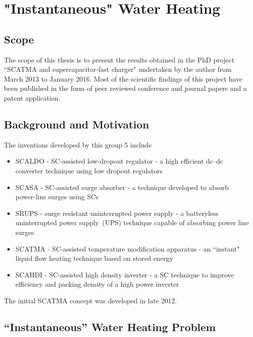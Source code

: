 \chapter{\textbf{"Instantaneous" Water Heating}}

\section{Scope}

The scope of this thesis is to present the results obtained in the PhD project ``SCATMA and supercapacitor-fast charger" undertaken by the author from March 2013 to January 2016. Most of the scientific findings of this project have been published in the form of peer reviewed conference and journal papers and a patent application. 

\section{Background and Motivation}

The inventions  developed by this group 
5
 include

\begin{itemize}
	
	\item SCALDO - SC-assisted low-dropout regulator - a high efficient dc--dc converter technique using low dropout regulators\cite{SCALDO_patent}
	\item SCASA - SC-assisted surge absorber - a technique developed to absorb power-line surges using SCs\cite{SCASA_patent}
	\item SRUPS - surge resistant uninterrupted power supply - a batteryless uninterrupted power supply~(UPS) technique capable of absorbing power line surges\cite{SRUPS:11}
	\item SCATMA - SC-assisted temperature modification apparatus - an ``instant" liquid flow heating technique based on stored energy\cite{SCATMA:14}
	\item SCAHDI - SC-assisted high density inverter - a SC technique to improve efficiency and packing density of a high power inverter
	
\end{itemize}

The initial SCATMA concept was developed in late 2012. 


\section{``Instantaneous'' Water Heating Problem}

